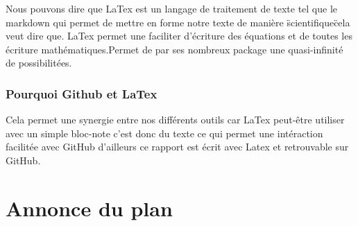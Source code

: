Nous pouvons dire que LaTex est un langage de traitement de texte tel que le markdown qui permet de mettre en forme notre texte de manière \"scientifique\" cela veut dire que. LaTex permet une faciliter d'écriture des équations et de toutes les écriture mathématiques.Permet de par ses nombreux package une quasi-infinité de possibilitées.

\subsubsection{Pourquoi Github et LaTex}
Cela permet une synergie entre nos différents outils car LaTex peut-être utiliser avec un simple bloc-note c'est donc du texte ce qui permet une intéraction facilitée avec GitHub d'ailleurs ce rapport est écrit avec Latex et retrouvable sur GitHub.


\hypertarget{Annonce du plan}{%
\section{Annonce du plan}\label{annonce du plan}}
